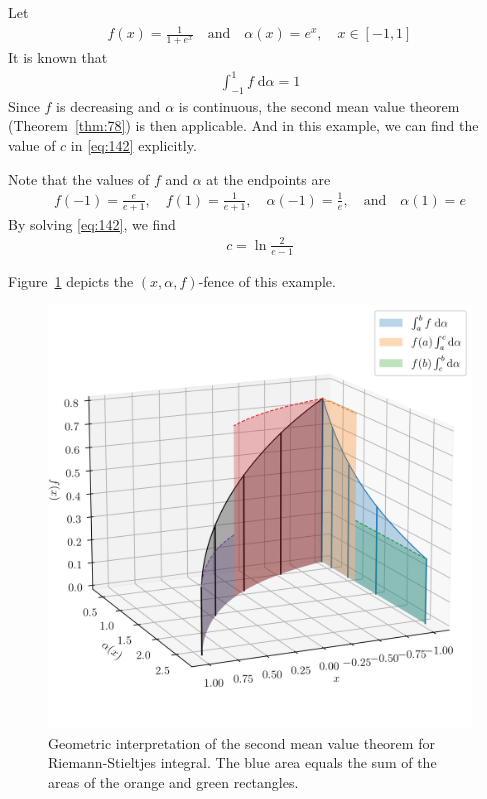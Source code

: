 \documentclass[thmcnt=section, 12pt]{my-elegantbook}
\begin{document}
\begin{example} \label{eg:11}
	Let
	\begin{align*}
		f(x) = \frac{1}{1 + e^x}
		\quad \text{and} \quad
		\alpha(x) = e^x,
		\quad 
		x \in [-1, 1]
	\end{align*}
	It is known that 
	\begin{align*}
		\int_{-1}^1 f \; \mathrm{d} \alpha = 1
	\end{align*}
	Since $f$ is decreasing and $\alpha$ is continuous,
	the second mean value theorem (Theorem~\ref{thm:78}) 
	is then applicable.
	And in this example, we can find the value of $c$ 
	in \eqref{eq:142} explicitly.
	
	Note that the values of $f$ and $\alpha$ at the endpoints are 
	\begin{align*}
		f(-1) = \frac{e}{e + 1},
		\quad
		f(1) = \frac{1}{e + 1},
		\quad 
		\alpha(-1) = \frac{1}{e},
		\quad \text{and} \quad 
		\alpha(1) = e
	\end{align*}
	By solving \eqref{eq:142}, we find 
	\begin{align*}
		c = \ln \frac{2}{e-1}
	\end{align*}

	Figure~\ref{fig:14} depicts the $(x,\alpha,f)$-fence of this example.

	\begin{figure}[ht]
		\centering
		\includegraphics[scale=0.5]{figures/ma-014.png}
		\caption{
			Geometric interpretation of 
			the second mean value theorem
			for Riemann-Stieltjes integral.
			The blue area
			equals the sum of the areas
			of the orange and green rectangles.
		}
		\label{fig:14}
	\end{figure}
\end{example}
\end{document}
